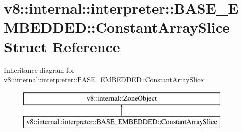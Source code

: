\hypertarget{structv8_1_1internal_1_1interpreter_1_1_b_a_s_e___e_m_b_e_d_d_e_d_1_1_constant_array_slice}{}\section{v8\+:\+:internal\+:\+:interpreter\+:\+:B\+A\+S\+E\+\_\+\+E\+M\+B\+E\+D\+D\+ED\+:\+:Constant\+Array\+Slice Struct Reference}
\label{structv8_1_1internal_1_1interpreter_1_1_b_a_s_e___e_m_b_e_d_d_e_d_1_1_constant_array_slice}
Inheritance diagram for v8\+:\+:internal\+:\+:interpreter\+:\+:B\+A\+S\+E\+\_\+\+E\+M\+B\+E\+D\+D\+ED\+:\+:Constant\+Array\+Slice\+:\begin{figure}[H]
\begin{center}
\leavevmode
\includegraphics[height=2.000000cm]{structv8_1_1internal_1_1interpreter_1_1_b_a_s_e___e_m_b_e_d_d_e_d_1_1_constant_array_slice}
\end{center}
\end{figure}
